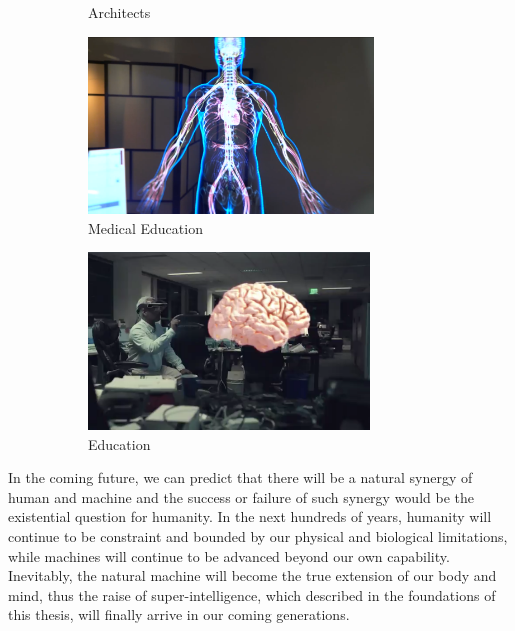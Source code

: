 \begin{figure}
\begin{subfigure}[b]{3.0in}
  \caption{Architects}
  \label{fig:architects}
\end{subfigure}
\begin{subfigure}[b]{3.0in}
\centering
  \includegraphics[height=1.85in]{ch7/figures/future/medical.png} 
  \caption{Medical Education}
  \label{fig:m_education}
\end{subfigure}
\begin{subfigure}[b]{3.0in}
\centering
  \includegraphics[height=1.85in]{ch7/figures/future/education.png} 
  \caption{Education}
  \label{fig:education}
\end{subfigure}
\caption{}
\label{fig:futureAR}
\end{figure}

In the coming future, we can predict that there will be a natural synergy of human and machine and the success or failure of such synergy would be the existential question for humanity. In the next hundreds of years, humanity will continue to be constraint and bounded by our physical and biological limitations, while machines will continue to be advanced beyond our own capability. Inevitably, the natural machine will become the true extension of our body and mind, thus the raise of super-intelligence, which described in the foundations of this thesis, will finally arrive in our coming generations.

